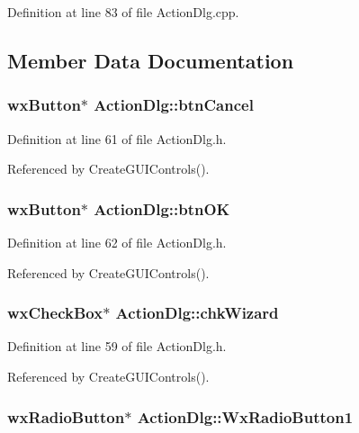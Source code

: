 Definition at line 83 of file Action\-Dlg.cpp.

\subsection{Member Data Documentation}
\subsubsection{\setlength{\rightskip}{0pt plus 5cm}wx\-Button$\ast$ {\bf Action\-Dlg::btn\-Cancel}\hspace{0.3cm}{\tt  [private]}}\label{class_action_dlg_ed42c3cba69a5a8a1e37e4bd6ccec3b1}




Definition at line 61 of file Action\-Dlg.h.

Referenced by Create\-GUIControls().
\subsubsection{\setlength{\rightskip}{0pt plus 5cm}wx\-Button$\ast$ {\bf Action\-Dlg::btn\-OK}\hspace{0.3cm}{\tt  [private]}}\label{class_action_dlg_c2366baa48bda285b7ea1f8e3b67ac9b}




Definition at line 62 of file Action\-Dlg.h.

Referenced by Create\-GUIControls().
\subsubsection{\setlength{\rightskip}{0pt plus 5cm}wx\-Check\-Box$\ast$ {\bf Action\-Dlg::chk\-Wizard}\hspace{0.3cm}{\tt  [private]}}\label{class_action_dlg_fe28c5a911bfd8781f314db32fe3b080}




Definition at line 59 of file Action\-Dlg.h.

Referenced by Create\-GUIControls().
\subsubsection{\setlength{\rightskip}{0pt plus 5cm}wx\-Radio\-Button$\ast$ {\bf Action\-Dlg::Wx\-Radio\-Button1}\hspace{0.3cm}{\tt  [private]}}\label{class_action_dlg_4dd755b97c6e5312937b75820338db5b}




